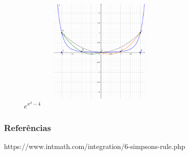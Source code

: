 \documentclass{beamer}
\begin{document}
\begin{frame}
	\begin{figure}[htb]
	\centering
    	    \includegraphics[width=8cm, height=5cm]{images/x3.png}
       	        \vspace{0.01em}
       	 \caption{$e^{x^2 -4}$}
	\end{figure}
\end{frame}
\begin{frame}
\frametitle{Referências}
https://www.intmath.com/integration/6-simpsons-rule.php
\end{frame}
\end{document}
